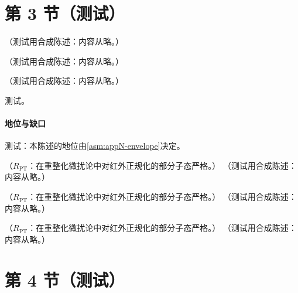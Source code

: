 \section{第 3 节（测试）}\label{sec:method-gy}

\begin{remark}\label{rem:method-abs-failure}
（测试用合成陈述：内容从略。）
\end{remark}

\begin{lemma}\label{lem:method-gy}
（测试用合成陈述：内容从略。）
\end{lemma}

\begin{proposition}\label{prop:method-gy-suppression}
（测试用合成陈述：内容从略。）
\end{proposition}
\begin{proofsketch}测试。\end{proofsketch}
\paragraph{地位与缺口}测试：本陈述的地位由\cref{asm:appN-envelope}决定。

\begin{lemma}\label{lem:method-ward-elementary}
（$R_{\mathrm{PT}}$：在重整化微扰论中对红外正规化的部分子态严格。）
（测试用合成陈述：内容从略。）
\end{lemma}

\begin{lemma}\label{lem:method-ward-abelian}
（$R_{\mathrm{PT}}$：在重整化微扰论中对红外正规化的部分子态严格。）
（测试用合成陈述：内容从略。）
\end{lemma}

\begin{proposition}\label{prop:method-ward-one}
（$R_{\mathrm{PT}}$：在重整化微扰论中对红外正规化的部分子态严格。）
（测试用合成陈述：内容从略。）
\end{proposition}

\section{第 4 节（测试）}\label{sec:method-ward}

